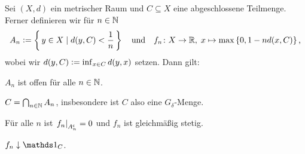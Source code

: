 \documentclass[../main/main.tex]{subfiles}
\begin{document}
	\begin{Hilfssatz}
		\label{lem:opensets}
		Sei $(X, d)$ ein metrischer Raum und $C \subseteq X$ eine abgeschlossene 
		Teilmenge. Ferner definieren wir für $n \in \mathbb{N}$
		$$ A_n \vcentcolon = \left\{\, y \in X \; | \; d(y, C) < \frac{1}{n} \,\right\} \quad \text{und} \quad f_n \colon X \to \mathbb{R}, \; x \mapsto \max \left\{0, 1-n d(x, C)\right\}  \text{,}$$
		wobei wir $d(y, C) \vcentcolon = \inf_{x \in C} d(y, x)$ setzen.
		Dann gilt:
		\begin{enumeratethm}
			\item $A_n$ ist offen für alle $n \in \mathbb{N}$.
			\item $C = \bigcap_{n \in \mathbb{N}} A_n$, insbesondere ist $C$ also eine $G_\delta$-Menge.
			\item Für alle $n$ ist $\left.f_n\right|_{A_n^\mathsf{c}} = 0$ und $f_n$ ist gleichmäßig stetig.
			\item $f_n \convdown \indfct_C$.
		\end{enumeratethm}
	\end{Hilfssatz}
\end{document}
